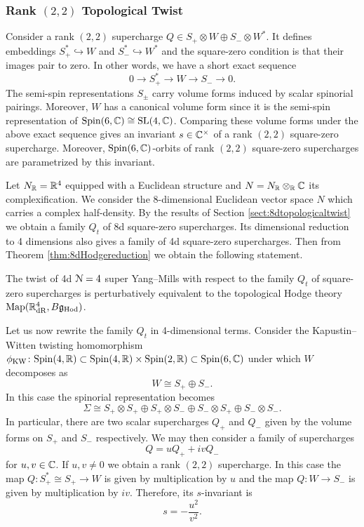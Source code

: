 \documentclass[10pt, oneside]{article}
\newcommand{\Hod}{\mathrm{Hod}}
\begin{document}
\subsubsection{Rank \texorpdfstring{$(2, 2)$}{(2,2)} Topological Twist}
\label{sect:4dqgltwist}

Consider a rank $(2, 2)$ supercharge $Q\in S_+\otimes W\oplus S_-\otimes W^*$. It defines embeddings $S_+^*\hookrightarrow W$ and $S_-^*\hookrightarrow W^*$ and the square-zero condition is that their images pair to zero. In other words, we have a short exact sequence
\[0\longrightarrow S_+^*\longrightarrow W\longrightarrow S_-\longrightarrow 0.\]
The semi-spin representations $S_\pm$ carry volume forms induced by scalar spinorial pairings. Moreover, $W$ has a canonical volume form since it is the semi-spin representation of $\mathrm{Spin}(6, \mathbb C)\cong \mathrm{SL}(4, \mathbb C)$. Comparing these volume forms under the above exact sequence gives an invariant $s\in\mathbb C^\times$ of a rank $(2, 2)$ square-zero supercharge. Moreover, $\mathrm{Spin}(6, \mathbb C)$-orbits of rank $(2, 2)$ square-zero supercharges are parametrized by this invariant.

Let $N_\mathbb R=\mathbb R^4$ equipped with a Euclidean structure and $N=N_\mathbb R\otimes_\mathbb R\mathbb C$ its complexification. We consider the 8-dimensional Euclidean vector space $N$ which carries a complex half-density. By the results of Section \ref{sect:8dtopologicaltwist} we obtain a family $Q_t$ of 8d square-zero supercharges. Its dimensional reduction to 4 dimensions also gives a family of 4d square-zero supercharges. Then from Theorem \ref{thm:8dHodgereduction} we obtain the following statement.

\begin{theorem}
The twist of 4d $\mathcal N=4$ super Yang--Mills with respect to the family $Q_t$ of square-zero supercharges is perturbatively equivalent to the topological Hodge theory $\map(\RR^4_{\mathrm{dR}}, B\fg_{\Hod})$.
\label{thm:4d422Hodgetwist}
\end{theorem}

Let us now rewrite the family $Q_t$ in 4-dimensional terms. Consider the Kapustin--Witten twisting homomorphism $\phi_{\mathrm{KW}}\colon \mathrm{Spin}(4, \mathbb R)\subset \mathrm{Spin}(4, \mathbb R)\times \mathrm{Spin}(2, \mathbb R)\subset \mathrm{Spin}(6, \mathbb C)$ under which $W$ decomposes as
\[W\cong S_+\oplus S_-.\]
In this case the spinorial representation becomes
\[\Sigma\cong S_+\otimes S_+\oplus S_+\otimes S_-\oplus S_-\otimes S_+\oplus S_-\otimes S_-.\]
In particular, there are two scalar supercharges $Q_+$ and $Q_-$ given by the volume forms on $S_+$ and $S_-$ respectively. We may then consider a family of supercharges
\[Q = u Q_+ + i v Q_-\]
for $u, v\in\mathbb C$. If $u,v\neq 0$ we obtain a rank $(2, 2)$ supercharge. In this case the map $Q\colon S_+^*\cong S_+\rightarrow W$ is given by multiplication by $u$ and the map $Q\colon W\rightarrow S_-$ is given by multiplication by $iv$. Therefore, its $s$-invariant is
\[s = -\frac{u^2}{v^2}.\]
\end{document}

